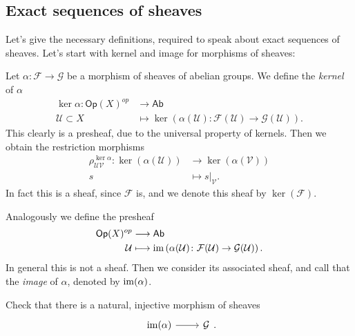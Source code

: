 \documentclass[../Main]{subfiles}
\begin{document}
\subsection{Exact sequences of sheaves}
Let's give the necessary definitions, required to speak about
exact sequences of sheaves.
Let's start with kernel and image for morphisms of sheaves:
\begin{defn}
	Let $\alpha\colon \mathcal{F} \to \mathcal{G}$ be a morphism
	of sheaves of abelian groups.
	We define the {\em kernel} of $\alpha$
	\begin{align}
		\ker \alpha: \mathsf{Op}(X)^{op} &\longrightarrow \mathsf{Ab} \\
		\mathcal{U} \subset X &\longmapsto \ker \left( \alpha(\mathcal{U})\colon
		\mathcal{F}(\mathcal{U})\to \mathcal{G}(\mathcal{U}) \right) \nonumber
	.\end{align} 
	This clearly is a presheaf, due to the universal property of kernels.
	Then we obtain the restriction morphisms
	\begin{align}
		\rho_{\mathcal{UV}}^{\ker \alpha}
		\colon \ker \left( \alpha(\mathcal{U}) \right) &\longrightarrow 
		\ker \left( \alpha(\mathcal{V}) \right)\\
		s &\longmapsto \left.s\right|_{\mathcal{V}}  \nonumber
	.\end{align} 
	In fact this is a sheaf, since $\mathcal{F}$ is, and we denote this sheaf
	by $\ker (\mathcal{F})$.

	Analogously we define the presheaf
	\begin{align}
		\mathsf{Op}(X)^{op} &\longrightarrow \mathsf{Ab} \\
		\mathcal{U} &\longmapsto \operatorname{im} \left( \alpha(\mathcal{U})\colon
		\mathcal{F}(\mathcal{U})\to \mathcal{G}(\mathcal{U}) \right) \nonumber
	.\end{align} 
	In general this is not a sheaf. Then we consider its associated sheaf,
	and call that the {\em image} of $\alpha$, denoted by $\operatorname{im}(\alpha)$.
\end{defn}

\begin{exr}
	Check that there is a natural, injective morphism of sheaves
	\begin{equation}
		\begin{tikzcd}
			\ima(\alpha) \arrow[r, "", rightarrow] &
			\mathcal{G}
		\end{tikzcd}
	.\end{equation} 
\end{exr} 
\end{document}
